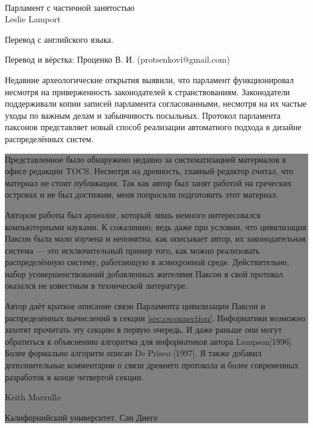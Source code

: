 \documentclass[12pt, a4paper]{article} %
\begin{document}
\thispagestyle{empty}
~
\\[3cm]

\begin{minipage}{10cm}
\begin{center}
{\Huge Парламент с частичной занятостью}\\[1cm]
{\Large Leslie Lamport}\\[1cm]
\end{center}
\end{minipage}

\hfill
\vfill

\newpage
\thispagestyle{empty}
Перевод с английского языка.

Перевод и вёрстка: Проценко В. И. (protsenkovi@gmail.com)

\newpage

Недавние археологические открытия выявили, что парламент функционировал несмотря на приверженность законодателей к странствованиям. Законодатели поддерживали копии записей парламента согласованными, несмотря на их частые уходы по важным делам и забывчивость посыльных. Протокол парламента паксонов представляет новый способ реализации автоматного подхода в дизайне распределённых систем.\\

\noindent\colorbox{gray}{
 \parbox{\textwidth}{
Представленное было обнаружено недавно за систематизацией материалов в офисе редакции TOCS. Несмотря на древность, главный редактор считал, что материал не стоит публикации. Так как автор был занят работой на греческих островах и не был достижим, меня попросили подготовить этот материал.

Автором работы был археолог, который лишь немного интересовался компьютерными науками. К сожалению; ведь даже при условии, что цивилизация Паксон была мало изучена и непонятна, как описывает автор, их законодательная система --- это исключительный пример того, как можно реализовать распределённую систему, работающую в асинхронной среде. Действительно, набор усовершенствований добавленных жителями Паксон в свой протокол оказался не известным в технической литературе.

Автор даёт краткое описание связи Парламента цивилизации Паксон и распределённых вычислений в секции \ref{sec:csconnection}. Информатики возможно захотят прочитать эту секцию в первую очередь. И даже раньше они могут обратиться к объяснению алгоритма для информатиков автора Lampson[1996]. Более формально алгоритм описан De Prisco [1997]. Я также добавил дополнительные комментарии о связи древнего протокола и более современных разработок в конце четвертой секции.

\begin{flushright}
Keith Marzullo

Калифорнийский университет, Сан Диего
\end{flushright}
}}
\end{document}
